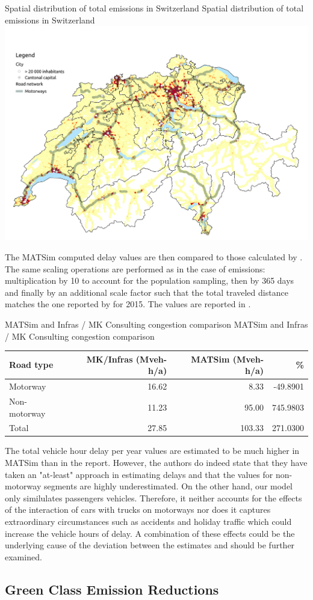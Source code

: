 \createfigure%
{Spatial distribution of total emissions in Switzerland}%
{Spatial distribution of total emissions in Switzerland}%
{\label{fig:spatialDelays}}%
{\includegraphics[width=1.0\textwidth, angle=0]{figures/total_delays_heatmap.pdf}}%
{}

The MATSim computed delay values are then compared to those calculated by \cite{mkinfras2016staukosten}.
The same scaling operations are performed as in the case of emissions: multiplication by 10 to account for the population sampling, then by 365 days and finally by an additional scale factor such that the total traveled distance matches the one reported by \cite{foen2010pollutants} for 2015.
The values are reported in .


\createtable%
{MATSim and Infras / MK Consulting congestion comparison}%
{MATSim and Infras / MK Consulting congestion comparison}%
{\label{tab:delayValueComparison}}%
{%
  \begin{tabular}[c]{lrrr}
    \toprule
    Road type & MK/Infras (Mveh-h/a) & MATSim (Mveh-h/a) & \%  \\ 
    \midrule
    Motorway      & 16.62 &    8.33 &  -49.8901 \\
    Non-motorway  & 11.23 &   95.00 &  745.9803 \\
    Total &         27.85 &  103.33 &  271.0300 \\
    \bottomrule
  \end{tabular}
}%
{}

The total vehicle hour delay per year values are estimated to be much higher in MATSim than in the report.
However, the authors do indeed state that they have taken an "at-least" approach in estimating delays and that the values for non-motorway segments are highly underestimated.
On the other hand, our model only similulates passengers vehicles.
Therefore, it neither accounts for the effects of the interaction of cars with trucks on motorways nor does it captures extraordinary circumstances such as accidents and holiday traffic which could increase the vehicle hours of delay.
A combination of these effects could be the underlying cause of the deviation between the estimates and should be further examined.


\subsection{Green Class Emission Reductions}
